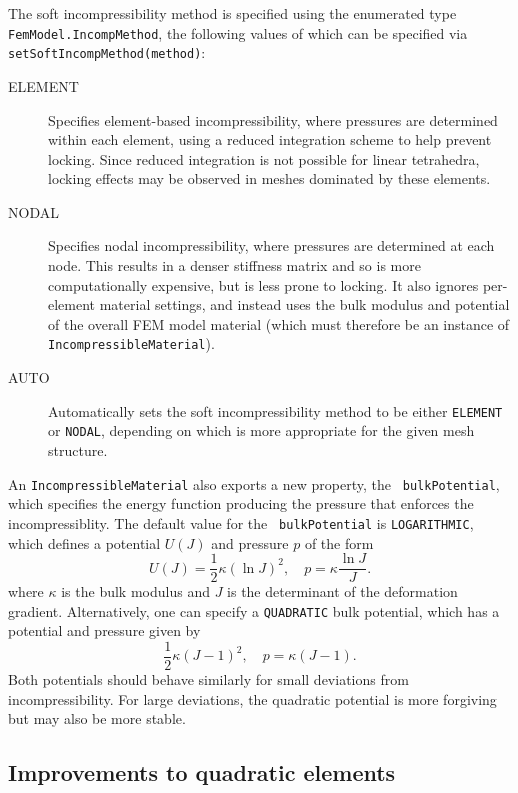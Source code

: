 \documentclass{article}
\begin{document}
The soft incompressibility method is specified using the enumerated
type {\tt FemModel.IncompMethod}, the following values of which can be
specified via {\tt setSoftIncompMethod(method)}:

\begin{description}

\item[ELEMENT] \mbox{} 
Specifies element-based incompressibility,
where pressures are determined within each element, using a reduced
integration scheme to help prevent locking. Since
reduced integration is not possible for linear tetrahedra,
locking effects may be observed in meshes dominated by these elements.

\item[NODAL] \mbox{} 
Specifies nodal incompressibility, where pressures are
determined at each node. This results in a denser stiffness
matrix and so is more computationally expensive, but is
less prone to locking. It also ignores
per-element material settings, and instead uses the bulk modulus
and potential of the overall FEM model material (which
must therefore be an instance of {\tt IncompressibleMaterial}).

\item[AUTO] \mbox{}
Automatically sets the soft incompressibility method to be either
{\tt ELEMENT} or {\tt NODAL}, depending on which is
more appropriate for the given mesh structure.

\end{description}

An {\tt IncompressibleMaterial} also exports a new property, the {\tt
bulkPotential}, which specifies the energy function producing the
pressure that enforces the incompressiblity. The default value for the {\tt
bulkPotential} is {\tt LOGARITHMIC}, which defines a potential $U(J)$
and pressure $p$ of the form
\[
U(J) = \frac{1}{2} \kappa (\ln J)^2, \quad p = \kappa \frac{\ln J}{J}.
\]
where $\kappa$ is the bulk modulus and
$J$ is the determinant of the deformation gradient.
Alternatively, one can specify a {\tt QUADRATIC}
bulk potential, which has a potential and pressure given by
\[
\frac{1}{2} \kappa (J-1)^2, \quad p = \kappa (J - 1).
\]
Both potentials should behave similarly for small deviations from
incompressibility. For large deviations, the quadratic potential is
more forgiving but may also be more stable.

\subsection*{Improvements to quadratic elements}
\end{document}
